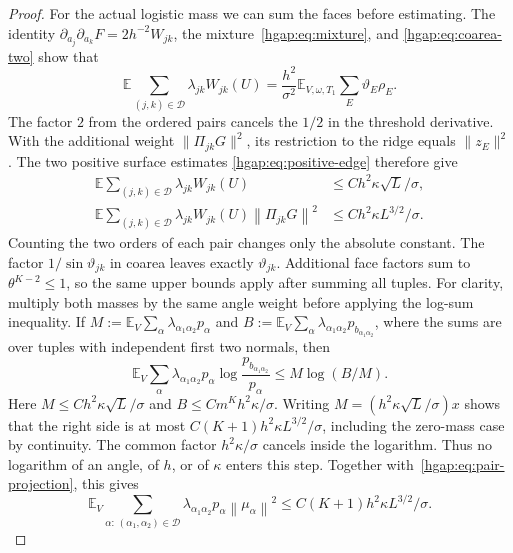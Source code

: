 \documentclass[11pt,letterpaper]{article}
\theoremstyle{remark}
\newcommand{\E}{\mathbb E}
\newcommand{\cD}{\mathcal D}
\newcommand{\norm}[1]{\left\lVert#1\right\rVert}
\begin{document}
\begin{proof}
For the actual logistic mass we can sum the faces before estimating.
The identity $\partial_{a_j}\partial_{a_k}F=2h^{-2}W_{jk}$,
the mixture~\eqref{hgap:eq:mixture}, and
\eqref{hgap:eq:coarea-two} show that
\[
 \E\sum_{(j,k)\in\cD}\lambda_{jk}W_{jk}(U)
 =\frac{h^2}{\sigma^2}
       \E_{V,\omega,T_1}\sum_E\vartheta_E\rho_E.
\]
The factor $2$ from the ordered pairs cancels the $1/2$ in the
threshold derivative. With the additional weight
$\|\Pi_{jk}G\|^2$, its restriction to the ridge equals
$\|z_E\|^2$. The two positive surface estimates
\eqref{hgap:eq:positive-edge} therefore give
\begin{align}
 \E\sum_{(j,k)\in\cD}\lambda_{jk}W_{jk}(U)
   &\le C h^2\kappa\sqrt L/\sigma,\label{hgap:eq:pair-mass}\\
 \E\sum_{(j,k)\in\cD}\lambda_{jk}W_{jk}(U)\norm{\Pi_{jk}G}^2
   &\le C h^2\kappa L^{3/2}/\sigma.\label{hgap:eq:pair-projection}
\end{align}
Counting the two orders of each pair changes only the absolute constant.
The factor $1/\sin\vartheta_{jk}$ in coarea leaves exactly
$\vartheta_{jk}$. Additional face factors sum to $\theta^{K-2}\le1$,
so the same upper bounds apply after summing all tuples.
For clarity, multiply both masses by the same angle weight before
applying the log-sum inequality. If
$M:=\E_V\sum_\alpha\lambda_{\alpha_1\alpha_2}p_\alpha$ and
$B:=\E_V\sum_\alpha\lambda_{\alpha_1\alpha_2}p_{b_{\alpha_1\alpha_2}}$,
where the sums are over tuples with independent first two normals, then
\[
 \E_V\sum_\alpha\lambda_{\alpha_1\alpha_2}p_\alpha
       \log\frac{p_{b_{\alpha_1\alpha_2}}}{p_\alpha}
 \le M\log(B/M).
\]
Here $M\le Ch^2\kappa\sqrt L/\sigma$ and
$B\le Cm^Kh^2\kappa/\sigma$. Writing
$M=(h^2\kappa\sqrt L/\sigma)x$ shows that the right side is at most
$C(K+1)h^2\kappa L^{3/2}/\sigma$, including the zero-mass case by
continuity. The common factor $h^2\kappa/\sigma$ cancels inside the
logarithm. Thus no logarithm of an angle, of $h$, or of $\kappa$ enters
this step.
Together with~\eqref{hgap:eq:pair-projection}, this gives
\begin{equation}
 \E_V\sum_{\alpha:\,(\alpha_1,\alpha_2)\in\cD}
 \lambda_{\alpha_1\alpha_2}p_\alpha\norm{\mu_\alpha}^2
 \le C(K+1)h^2\kappa L^{3/2}/\sigma.
 \label{hgap:eq:pair-means}
\end{equation}


\end{proof}
\end{document}
